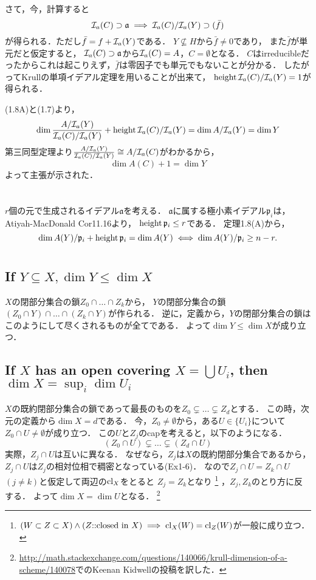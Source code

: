 \documentclass[a4paper]{jarticle}
\newcommand{\I}[1]{\mathfrak{#1}}
\begin{document}
    さて，今，計算すると
    \[ \defsa(C) \supset \I{a} \implies \defsa(C)/\defsa(Y) \supset (\bar{f}) \]
    が得られる．ただし$\bar{f}=f+\mathcal{I}_a(Y)$である．
    $Y \not \subseteq H$から$\bar{f} \neq 0$であり，
    また$\bar{f}$が単元だと仮定すると，
    $\defsa(C) \supset \I{a}$から$\mathcal{I}_a(C)=A$，$C=\emptyset$となる．
    $C$はirreducibleだったからこれは起こりえず，$\bar{f}$は零因子でも単元でもないことが分かる．
    したがってKrullの単項イデアル定理を用いることが出来て，
    $\operatorname{height} \mathcal{I}_a(C)/\mathcal{I}_a(Y)=1$が得られる．

    (1.8A)と(1.7)より，
    \[ \dim \frac{A/\mathcal{I}_a(Y)}{\mathcal{I}_a(C)/\mathcal{I}_a(Y)}+\operatorname{height} \mathcal{I}_a(C)/\mathcal{I}_a(Y)=\dim A/\mathcal{I}_a(Y)=\dim Y \]
    第三同型定理より$\frac{A/\mathcal{I}_a(Y)}{\mathcal{I}_a(C)/\mathcal{I}_a(Y)} \cong A/\mathcal{I}_a(C)$がわかるから，
    \[ \dim A(C)+1=\dim Y \]
    よって主張が示された．

\section{}
    $r$個の元で生成されるイデアル$\I{a}$を考える．
    $\I{a}$に属する極小素イデアル$\I{p}_i$は，Atiyah-MacDonald Cor11.16より，
    $\height \I{p}_i \leq r$である．
    定理1.8(A)から，
    \[ \dim A(Y)/\I{p}_i+\height \I{p}_i=\dim A(Y) \iff \dim A(Y)/\I{p}_i \geq n-r. \]

\section{} %
    \subsection{If $Y \subseteq X, \dim Y \leq \dim X$}
    $X$の閉部分集合の鎖$Z_0 \cap \dots \cap Z_k$から，
    $Y$の閉部分集合の鎖$(Z_0 \cap Y) \cap \dots \cap (Z_k \cap Y)$が作られる．
    逆に，定義から，$Y$の閉部分集合の鎖はこのようにして尽くされるものが全てである．
    よって$\dim Y \leq \dim X$が成り立つ．

    \subsection{If $X$ has an open covering $X=\bigcup U_i$, then $\dim X=\sup_{i} \dim U_i$}
    $X$の既約閉部分集合の鎖であって最長のものを$Z_0 \subsetneq \dots \subsetneq Z_d$とする．
    この時，次元の定義から$\dim X=d$である．
    今，$Z_0 \neq \emptyset$から，ある$U \in \{U_i\}$について$Z_0 \cap U \neq \emptyset$が成り立つ．
    この$U$と$Z_j$のcapを考えると，以下のようになる．
    \[ (Z_0 \cap U) \subsetneq \dots \subsetneq (Z_d \cap U) \]
    実際，$Z_j \cap U$は互いに異なる．
    なぜなら，$Z_j$は$X$の既約閉部分集合であるから，$Z_j \cap U$は$Z_j$の相対位相で稠密となっている(Ex1-6)．
    なので$Z_j \cap U=Z_k \cap U$$(j \neq k)$と仮定して両辺の$\operatorname{cl}_{X}$をとると
    $Z_j=Z_k$となり
    \footnote{$(W \subset Z \subset X) \land (Z\mbox{::closed in }X) \implies \operatorname{cl}_{X}(W)=\operatorname{cl}_{Z}(W)$が一般に成り立つ．}
    ，$Z_j, Z_k$のとり方に反する．
    よって$\dim X=\dim U$となる．
    \footnote{\url{http://math.stackexchange.com/questions/140066/krull-dimension-of-a-scheme/140078}でのKeenan Kidwellの投稿を訳した．}
\end{document}
